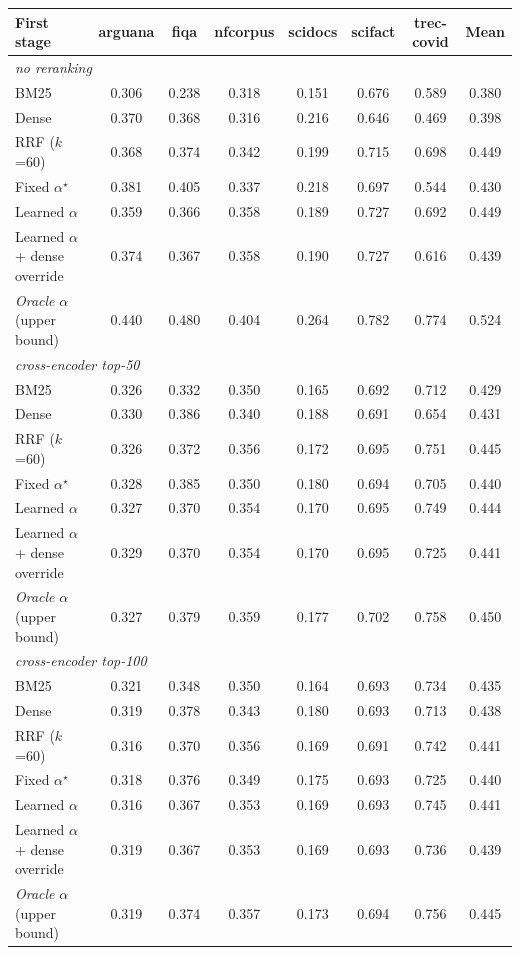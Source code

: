 \begin{tabular}{lccccccc}
\toprule
First stage & arguana & fiqa & nfcorpus & scidocs & scifact & trec-covid & Mean \\
\midrule
\multicolumn{8}{l}{\emph{no reranking}} \\
BM25 & 0.306 & 0.238 & 0.318 & 0.151 & 0.676 & 0.589 & 0.380 \\
Dense & 0.370 & 0.368 & 0.316 & 0.216 & 0.646 & 0.469 & 0.398 \\
RRF ($k$=60) & 0.368 & 0.374 & 0.342 & 0.199 & 0.715 & 0.698 & 0.449 \\
Fixed $\alpha^\star$ & 0.381 & 0.405 & 0.337 & 0.218 & 0.697 & 0.544 & 0.430 \\
Learned $\alpha$ & 0.359 & 0.366 & 0.358 & 0.189 & 0.727 & 0.692 & 0.449 \\
Learned $\alpha$ + dense override & 0.374 & 0.367 & 0.358 & 0.190 & 0.727 & 0.616 & 0.439 \\
\emph{Oracle} $\alpha$ (upper bound) & 0.440 & 0.480 & 0.404 & 0.264 & 0.782 & 0.774 & 0.524 \\
\midrule
\multicolumn{8}{l}{\emph{cross-encoder top-50}} \\
BM25 & 0.326 & 0.332 & 0.350 & 0.165 & 0.692 & 0.712 & 0.429 \\
Dense & 0.330 & 0.386 & 0.340 & 0.188 & 0.691 & 0.654 & 0.431 \\
RRF ($k$=60) & 0.326 & 0.372 & 0.356 & 0.172 & 0.695 & 0.751 & 0.445 \\
Fixed $\alpha^\star$ & 0.328 & 0.385 & 0.350 & 0.180 & 0.694 & 0.705 & 0.440 \\
Learned $\alpha$ & 0.327 & 0.370 & 0.354 & 0.170 & 0.695 & 0.749 & 0.444 \\
Learned $\alpha$ + dense override & 0.329 & 0.370 & 0.354 & 0.170 & 0.695 & 0.725 & 0.441 \\
\emph{Oracle} $\alpha$ (upper bound) & 0.327 & 0.379 & 0.359 & 0.177 & 0.702 & 0.758 & 0.450 \\
\midrule
\multicolumn{8}{l}{\emph{cross-encoder top-100}} \\
BM25 & 0.321 & 0.348 & 0.350 & 0.164 & 0.693 & 0.734 & 0.435 \\
Dense & 0.319 & 0.378 & 0.343 & 0.180 & 0.693 & 0.713 & 0.438 \\
RRF ($k$=60) & 0.316 & 0.370 & 0.356 & 0.169 & 0.691 & 0.742 & 0.441 \\
Fixed $\alpha^\star$ & 0.318 & 0.376 & 0.349 & 0.175 & 0.693 & 0.725 & 0.440 \\
Learned $\alpha$ & 0.316 & 0.367 & 0.353 & 0.169 & 0.693 & 0.745 & 0.441 \\
Learned $\alpha$ + dense override & 0.319 & 0.367 & 0.353 & 0.169 & 0.693 & 0.736 & 0.439 \\
\emph{Oracle} $\alpha$ (upper bound) & 0.319 & 0.374 & 0.357 & 0.173 & 0.694 & 0.756 & 0.445 \\
\bottomrule
\end{tabular}